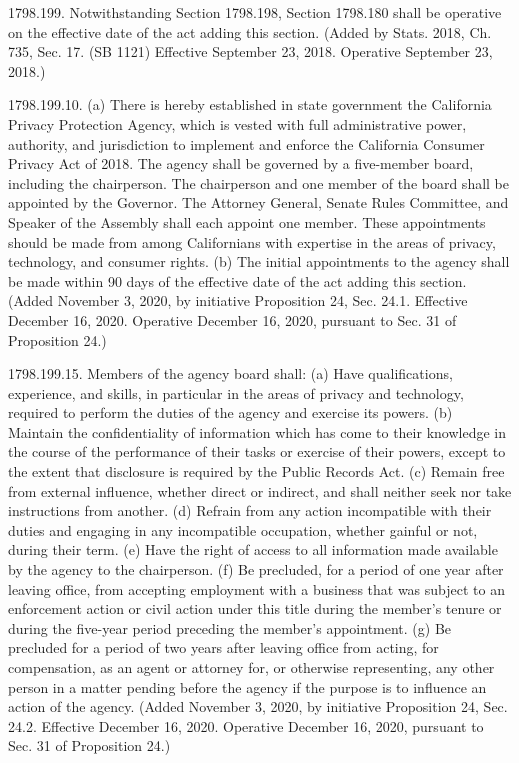 1798.199.  Notwithstanding Section 1798.198, Section 1798.180 shall be operative on the effective date of the act adding this section.
(Added by Stats. 2018, Ch. 735, Sec. 17. (SB 1121) Effective September 23, 2018. Operative September 23, 2018.)

1798.199.10.  (a) There is hereby established in state government the California Privacy Protection Agency, which is vested with full administrative power, authority, and jurisdiction to implement and enforce the California Consumer Privacy Act of 2018. The agency shall be governed by a five-member board, including the chairperson. The chairperson and one member of the board shall be appointed by the Governor. The Attorney General, Senate Rules Committee, and Speaker of the Assembly shall each appoint one member. These appointments should be made from among Californians with expertise in the areas of privacy, technology, and consumer rights.
(b) The initial appointments to the agency shall be made within 90 days of the effective date of the act adding this section.
(Added November 3, 2020, by initiative Proposition 24, Sec. 24.1. Effective December 16, 2020. Operative December 16, 2020, pursuant to Sec. 31 of Proposition 24.)

1798.199.15.  Members of the agency board shall:
(a) Have qualifications, experience, and skills, in particular in the areas of privacy and technology, required to perform the duties of the agency and exercise its powers.
(b) Maintain the confidentiality of information which has come to their knowledge in the course of the performance of their tasks or exercise of their powers, except to the extent that disclosure is required by the Public Records Act.
(c) Remain free from external influence, whether direct or indirect, and shall neither seek nor take instructions from another.
(d) Refrain from any action incompatible with their duties and engaging in any incompatible occupation, whether gainful or not, during their term.
(e) Have the right of access to all information made available by the agency to the chairperson.
(f) Be precluded, for a period of one year after leaving office, from accepting employment with a business that was subject to an enforcement action or civil action under this title during the member’s tenure or during the five-year period preceding the member’s appointment.
(g) Be precluded for a period of two years after leaving office from acting, for compensation, as an agent or attorney for, or otherwise representing, any other person in a matter pending before the agency if the purpose is to influence an action of the agency.
(Added November 3, 2020, by initiative Proposition 24, Sec. 24.2. Effective December 16, 2020. Operative December 16, 2020, pursuant to Sec. 31 of Proposition 24.)

